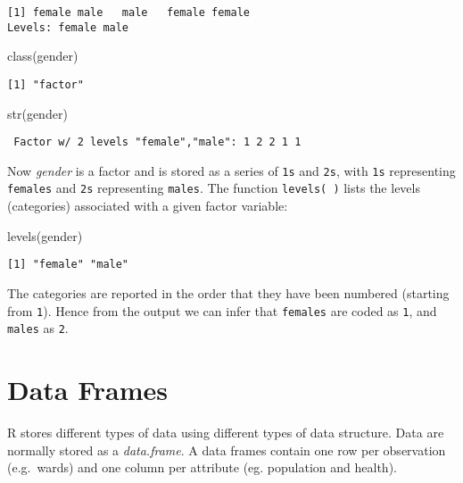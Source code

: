 \documentclass[
  letterpaper,
  krantz2]{style/krantz}
\newenvironment{Shaded}{\begin{snugshade}}{\end{snugshade}}
\newcommand{\FunctionTok}[1]{\textcolor[rgb]{0.28,0.35,0.67}{#1}}
\newcommand{\NormalTok}[1]{\textcolor[rgb]{0.00,0.23,0.31}{#1}}
\begin{document}
\begin{verbatim}
[1] female male   male   female female
Levels: female male
\end{verbatim}

\begin{Shaded}
\begin{Highlighting}[]
\FunctionTok{class}\NormalTok{(gender)}
\end{Highlighting}
\end{Shaded}

\begin{verbatim}
[1] "factor"
\end{verbatim}

\begin{Shaded}
\begin{Highlighting}[]
\FunctionTok{str}\NormalTok{(gender)}
\end{Highlighting}
\end{Shaded}

\begin{verbatim}
 Factor w/ 2 levels "female","male": 1 2 2 1 1
\end{verbatim}

Now \emph{gender} is a factor and is stored as a series of \texttt{1s}
and \texttt{2s}, with \texttt{1s} representing \texttt{females} and
\texttt{2s} representing \texttt{males}. The function
\texttt{levels(\ )} lists the levels (categories) associated with a
given factor variable:

\begin{Shaded}
\begin{Highlighting}[]
\FunctionTok{levels}\NormalTok{(gender)}
\end{Highlighting}
\end{Shaded}

\begin{verbatim}
[1] "female" "male"  
\end{verbatim}

The categories are reported in the order that they have been numbered
(starting from \texttt{1}). Hence from the output we can infer that
\texttt{females} are coded as \texttt{1}, and \texttt{males} as
\texttt{2}.

\hypertarget{data-frames}{%
\section{Data Frames}\label{data-frames}}

R stores different types of data using different types of data
structure. Data are normally stored as a \emph{data.frame}. A data
frames contain one row per observation (e.g.~wards) and one column per
attribute (eg. population and health).
\end{document}
